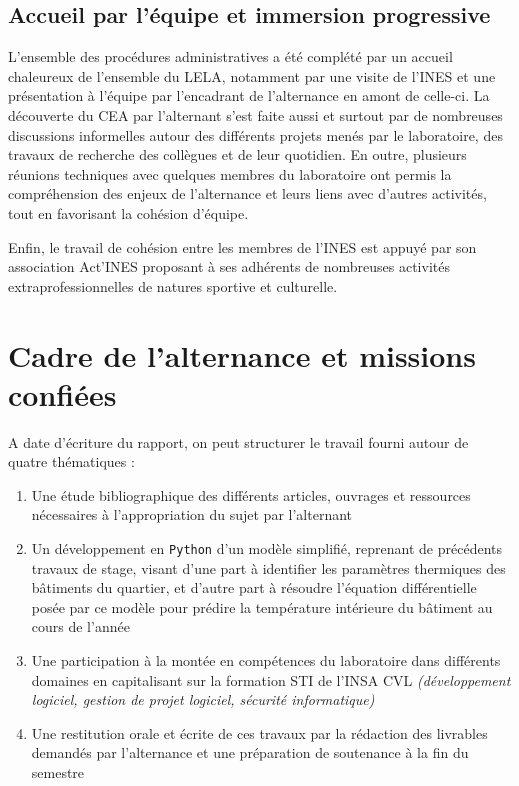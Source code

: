 \subsection{Accueil par l'équipe et immersion progressive}\label{subsec:accueil-par-l'equipe-et-immersion-progressive}

L'ensemble des procédures administratives a été complété par un accueil chaleureux de l'ensemble du \gls{LELA}, notamment par une visite
de l'\gls{INES} et une présentation à l'équipe par l'encadrant de l'alternance en amont de celle-ci.
La découverte du \gls{CEA} par l'alternant s'est faite aussi et surtout par de nombreuses discussions informelles autour des différents projets menés par le laboratoire, des travaux de recherche des collègues et de leur quotidien.
En outre, plusieurs réunions techniques avec quelques membres du laboratoire ont permis la compréhension des enjeux de l'alternance et leurs liens avec d'autres activités, tout en favorisant la cohésion d'équipe.

Enfin, le travail de cohésion entre les membres de l'\gls{INES} est appuyé par son association Act'\gls{INES} proposant à ses adhérents de nombreuses activités extraprofessionnelles de natures sportive et culturelle.

\section{Cadre de l'alternance et missions confiées}\label{ch:cadre-de-l'alternance-et-missions-confiees}

A date d'écriture du rapport, on peut structurer le travail fourni autour de quatre thématiques :
\begin{enumerate}
    \item Une étude bibliographique des différents articles, ouvrages et ressources nécessaires à l'appropriation du sujet par l'alternant
    \item Un développement en \texttt{Python} d'un modèle simplifié, reprenant de précédents travaux de stage, visant d'une part à identifier les paramètres thermiques des bâtiments du quartier, et d'autre part à résoudre l'équation différentielle posée par ce modèle pour prédire la température intérieure du bâtiment au cours de l'année
    \item Une participation à la montée en compétences du laboratoire dans différents domaines en capitalisant sur la formation \gls{STI} de l'INSA CVL \textit{(développement logiciel, gestion de projet logiciel, sécurité informatique)}
    \item Une restitution orale et écrite de ces travaux par la rédaction des livrables demandés par l'alternance et une préparation de soutenance à la fin du semestre
\end{enumerate}

